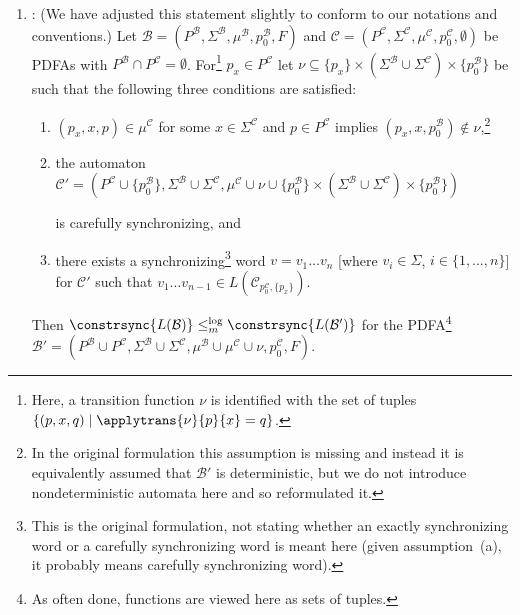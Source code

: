 \begin{enumerate}
	\item \cite[Thm.~31]{FernauGHHVW19}: (We have adjusted this statement slightly to conform to our notations and conventions.) 
	Let $\mathcal{B} = (P^{\mathcal{B}}, \Sigma^{\mathcal{B}}, 
	\mu^{\mathcal{B}}, p_0^{\mathcal{B}}, F)$ and 
	$\mathcal{C}=(P^{\mathcal{C}}, \Sigma^{\mathcal{C}},
	\mu^{\mathcal{C}}, p_0^{\mathcal{C}}, \emptyset)$ be PDFAs with
	$P^{\mathcal{B}} \cap P^{\mathcal{C}} = \emptyset$.  For\footnote{Here, 
		a transition function $\nu$ is identified with the set of tuples $\{ (p, x, q) \mid \applytrans{\nu}{p}{x} = q \}$.} $p_x \in
	P^{\mathcal{C}}$ let $\nu \subseteq \{p_x\} \times
	(\Sigma^{\mathcal{B}} \cup \Sigma^{\mathcal{C}}) \times
	\{p_0^{\mathcal{B}}\}$
	be such that the following three conditions are satisfied:
	\begin{enumerate}	
		\item $(p_x, x, p) \in \mu^{\mathcal C}$ for some $x \in \Sigma^{\mathcal C}$ and $p \in P^{\mathcal C}$
		implies $(p_x, x, p_0^{\mathcal B}) \notin \nu$,\footnote{In the original formulation
			this assumption is missing and instead it is equivalently
			assumed that $\mathcal B'$ is deterministic, but we do not introduce nondeterministic automata here
			and so reformulated it.}
		
		\item the automaton $\mathcal{C}'= (P^{\mathcal{C}} \cup\{p_0^{\mathcal{B}}\}, \Sigma^{\mathcal{B}} \cup \Sigma^{\mathcal{C}}, \mu^{\mathcal{C}} \cup \nu \cup \{p_0^{\mathcal{B}}\} \times (\Sigma^{\mathcal{B}} \cup \Sigma^{\mathcal{C}}) \times \{p_0^{\mathcal{B}}\})$
		
		is carefully synchronizing, and 
		\item there exists a synchronizing\footnote{This is the original formulation, not stating
			whether an exactly synchronizing word or a carefully synchronizing word is meant
			here (given assumption~(a), it probably means carefully synchronizing word).}
		word $v = v_1 \dots v_n$ [where $v_i \in \Sigma$, $i \in \{1,\ldots,n\}$]
		for $\mathcal{C}'$ such that $v_1 \dots v_{n-1} \in L(\mathcal{C}_{p_0^{\mathcal C}, \{p_x\}})$.
	\end{enumerate}
	Then $\constrsync{L(\mathcal B)} \leq_m^{\log} \constrsync{L(\mathcal B')}$
	for the PDFA\footnote{As often done, functions are viewed here as sets of tuples.}		
	$\mathcal{B'}=(P^{\mathcal{B}} \cup P^{\mathcal{C}}, \Sigma^{\mathcal{B}}
	\cup \Sigma^{\mathcal{C}}, 
	\mu^{\mathcal{B}} \cup \mu^{\mathcal{C}} \cup \nu,
	p_0^{\mathcal{C}}, F)$.
		

\end{enumerate}

